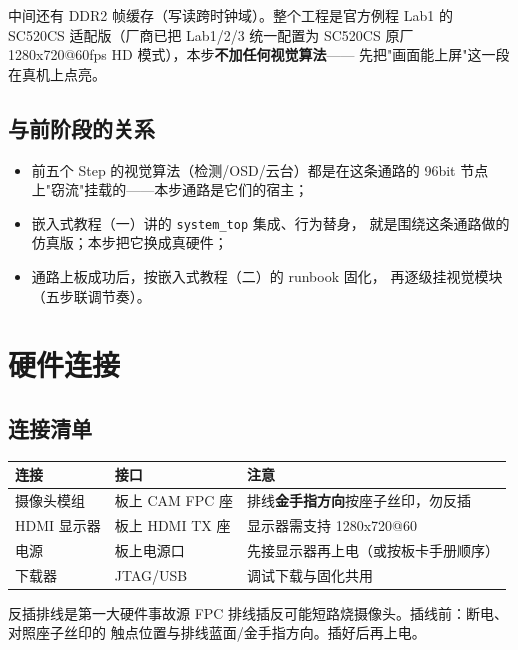 \documentclass[11pt]{ctexart}
\newcommand{\code}[1]{\texttt{#1}}
\begin{document}
中间还有 DDR2 帧缓存（写读跨时钟域）。整个工程是官方例程 Lab1 的
SC520CS 适配版（厂商已把 Lab1/2/3 统一配置为 SC520CS 原厂
1280x720@60fps HD 模式），本步\textbf{不加任何视觉算法}——
先把"画面能上屏"这一段在真机上点亮。

\subsection{与前阶段的关系}

\begin{itemize}
  \item 前五个 Step 的视觉算法（检测/OSD/云台）都是在这条通路的
    96bit 节点上"窃流"挂载的——本步通路是它们的宿主；
  \item 嵌入式教程（一）讲的 \code{system\_top} 集成、行为替身，
    就是围绕这条通路做的仿真版；本步把它换成真硬件；
  \item 通路上板成功后，按嵌入式教程（二）的 runbook 固化，
    再逐级挂视觉模块（五步联调节奏）。
\end{itemize}

\section{硬件连接}

\subsection{连接清单}

\begin{center}
\begin{tabular}{lll}
\toprule
\rowcolor{rowtint}\textbf{连接} & \textbf{接口} & \textbf{注意} \\
\midrule
摄像头模组 & 板上 CAM FPC 座 & 排线\textbf{金手指方向}按座子丝印，勿反插 \\
HDMI 显示器 & 板上 HDMI TX 座 & 显示器需支持 1280x720@60 \\
电源 & 板上电源口 & 先接显示器再上电（或按板卡手册顺序） \\
下载器 & JTAG/USB & 调试下载与固化共用 \\
\bottomrule
\end{tabular}
\end{center}

\begin{warnbox}{反插排线是第一大硬件事故源}
FPC 排线插反可能短路烧摄像头。插线前：断电、对照座子丝印的
触点位置与排线蓝面/金手指方向。插好后再上电。
\end{warnbox}
\end{document}
